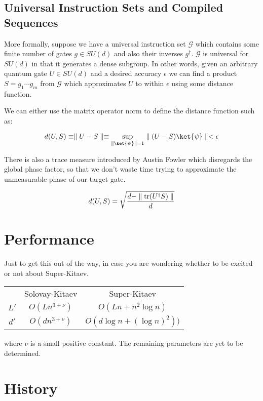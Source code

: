 \documentclass{article}
\theoremstyle{plain}
\begin{document}
\subsection{Universal Instruction Sets and Compiled Sequences}
More formally, suppose we have a universal instruction set $\mathcal{G}$ which
contains some finite number of gates $g \in SU(d)$ and also their inverses $g^\dagger$.
$\mathcal{G}$ is universal for $SU(d)$ in that it generates a dense subgroup.
In other words, given an arbitrary quantum gate $U \in SU(d)$ and a desired
accuracy $\epsilon$ we can find a product $S=g_1 \cdots g_m$ from $\mathcal{G}$
which approximates $U$ to within $\epsilon$ using some distance function.

We can either use the matrix operator norm to define the distance function
such as:

\begin{equation}
d(U,S) \equiv \norm{U - S} \equiv \sup_{\norm{\ket{\psi}}=1} \norm{(U-S)\ket{\psi}} < \epsilon
\end{equation}

There is also a trace measure introduced by Austin Fowler which disregards
the global phase factor, so that we don't waste time trying to approximate
the unmeasurable phase of our target gate.

\begin{equation}
d(U,S) = \sqrt{\frac{d - \parallel \mathrm{tr}(U^\dagger S) \parallel}{d}}
\end{equation}

\section{Performance}

Just to get this out of the way, in case you are wondering whether to be
excited or not about Super-Kitaev.

\begin{tabular}{|c|c|c|}
\hline
   & Solovay-Kitaev & Super-Kitaev\\
$L'$ & $O(Ln^{3+\nu})$ & $O(Ln + n^2 \log n)$\\
$d'$ & $O(dn^{3+\nu})$ & $O(d \log{n} + (\log{n})^2))$\\ 
\hline
\end{tabular}

where $\nu$ is a small positive constant.
The remaining parameters are yet to be determined.

\section{History}
\end{document}
